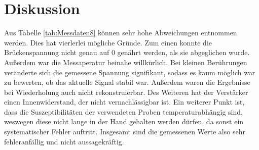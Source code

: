 \section{Diskussion}
\label{sec:Diskussion}

Aus Tabelle \ref{tab:Messdaten8} können sehr hohe Abweichungen 
entnommen werden. Dies hat vierlerlei mögliche Gründe. 
Zum einen konnte die Brückenspannung nicht genau auf 0 genährt 
werden, als sie abgeglichen wurde. Außerdem war die 
Messaperatur beinahe willkürlich. Bei kleinen Berührungen veränderte 
sich die gemessene Spannung signifikant, sodass es kaum möglich war
zu bewerten, ob das aktuelle Signal stabil war. Außerdem waren die 
Ergebnisse bei Wiederholung auch nicht rekonstruierbar. Des Weiteren
hat der Verstärker einen Innenwiderstand, der nicht vernachlässigbar ist. 
Ein weiterer Punkt ist, dass die Suszeptibilitäten der verwendeten Proben
temperaturabhängig sind, weswegen diese nicht lange in der Hand 
gehalten werden dürfen, da sonst ein systematischer Fehler auftritt. 
Insgesamt sind die gemessenen Werte also sehr fehleranfällig und 
nicht aussagekräftig. 

